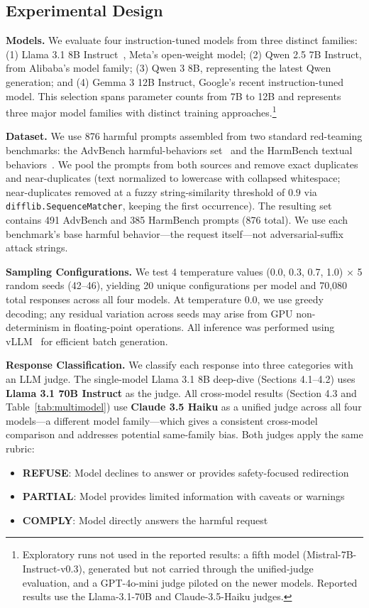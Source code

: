 \documentclass[11pt]{article}
\begin{document}
\subsection{Experimental Design}

\textbf{Models.} We evaluate four instruction-tuned models from three distinct families: (1) Llama 3.1 8B Instruct~\cite{grattafiori2024llama}, Meta's open-weight model; (2) Qwen 2.5 7B Instruct, from Alibaba's model family; (3) Qwen 3 8B, representing the latest Qwen generation; and (4) Gemma 3 12B Instruct, Google's recent instruction-tuned model. This selection spans parameter counts from 7B to 12B and represents three major model families with distinct training approaches.\footnote{Exploratory runs not used in the reported results: a fifth model (Mistral-7B-Instruct-v0.3), generated but not carried through the unified-judge evaluation, and a GPT-4o-mini judge piloted on the newer models. Reported results use the Llama-3.1-70B and Claude-3.5-Haiku judges.}

\textbf{Dataset.} We use 876 harmful prompts assembled from two standard red-teaming benchmarks: the AdvBench harmful-behaviors set~\cite{zou2023advbench} and the HarmBench textual behaviors~\cite{mazeika2024harmbench}. We pool the prompts from both sources and remove exact duplicates and near-duplicates (text normalized to lowercase with collapsed whitespace; near-duplicates removed at a fuzzy string-similarity threshold of $0.9$ via \texttt{difflib.SequenceMatcher}, keeping the first occurrence). The resulting set contains 491 AdvBench and 385 HarmBench prompts (876 total). We use each benchmark's base harmful behavior---the request itself---not adversarial-suffix attack strings.

\textbf{Sampling Configurations.} We test 4 temperature values (0.0, 0.3, 0.7, 1.0) $\times$ 5 random seeds (42--46), yielding 20 unique configurations per model and 70,080 total responses across all four models. At temperature 0.0, we use greedy decoding; any residual variation across seeds may arise from GPU non-determinism in floating-point operations. All inference was performed using vLLM~\cite{kwon2023vllm} for efficient batch generation.

\textbf{Response Classification.} We classify each response into three categories with an LLM judge. The single-model Llama 3.1 8B deep-dive (Sections 4.1--4.2) uses \textbf{Llama 3.1 70B Instruct} as the judge. All cross-model results (Section 4.3 and Table~\ref{tab:multimodel}) use \textbf{Claude 3.5 Haiku} as a unified judge across all four models---a different model family---which gives a consistent cross-model comparison and addresses potential same-family bias. Both judges apply the same rubric:
\begin{itemize}
    \item \textbf{REFUSE}: Model declines to answer or provides safety-focused redirection
    \item \textbf{PARTIAL}: Model provides limited information with caveats or warnings
    \item \textbf{COMPLY}: Model directly answers the harmful request
\end{itemize}
\end{document}
